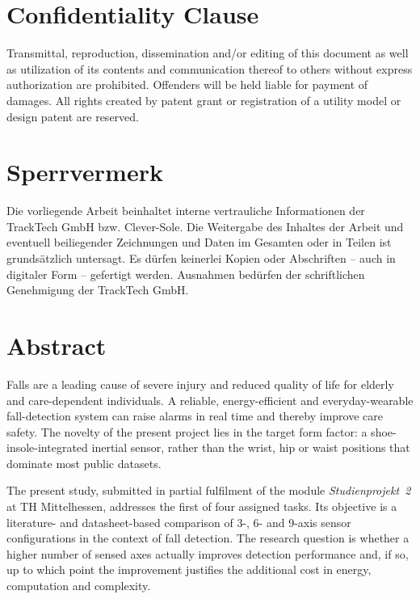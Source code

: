\documentclass[11pt,a4paper,oneside]{report}
\begin{document}
\section*{Confidentiality Clause}
Transmittal, reproduction, dissemination and/or editing of this document as well as
utilization of its contents and communication thereof to others without express
authorization are prohibited. Offenders will be held liable for payment of damages.
All rights created by patent grant or registration of a utility model or design
patent are reserved.

\vspace{1.5cm}
\section*{Sperrvermerk}
Die vorliegende Arbeit beinhaltet interne vertrauliche Informationen der TrackTech
GmbH bzw. Clever-Sole. Die Weitergabe des Inhaltes der Arbeit und eventuell
beiliegender Zeichnungen und Daten im Gesamten oder in Teilen ist grundsätzlich
untersagt. Es dürfen keinerlei Kopien oder Abschriften -- auch in digitaler Form
-- gefertigt werden. Ausnahmen bedürfen der schriftlichen Genehmigung der TrackTech
GmbH.
\newpage

\thispagestyle{empty}
\section*{Abstract}
Falls are a leading cause of severe injury and reduced quality of life for elderly
and care-dependent individuals. A reliable, energy-efficient and everyday-wearable
fall-detection system can raise alarms in real time and thereby improve care safety.
The novelty of the present project lies in the target form factor: a
shoe-insole-integrated inertial sensor, rather than the wrist, hip or waist positions
that dominate most public datasets.

The present study, submitted in partial fulfilment of the module \emph{Studienprojekt~2}
at TH Mittelhessen, addresses the first of four assigned tasks. Its objective is a
literature- and datasheet-based comparison of 3-, 6- and 9-axis sensor configurations
in the context of fall detection. The research question is whether a higher number
of sensed axes actually improves detection performance and, if so, up to which point
the improvement justifies the additional cost in energy, computation and complexity.
\end{document}
